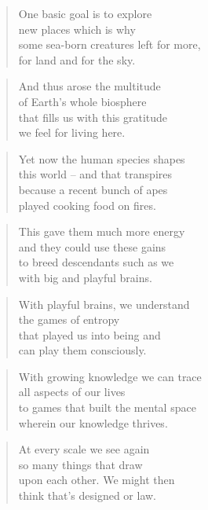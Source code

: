 \documentclass[10pt,a4paper]{article}
\begin{document}
\begin{paracol}{2}
\begin{verse}
One basic goal is to explore\\
new places which is why\\
some sea-born creatures left for more,\\
for land and for the sky.
\end{verse}

\begin{verse}
And thus arose the multitude\\
of Earth’s whole biosphere\\
that fills us with this gratitude\\
we feel for living here.
\end{verse}

\begin{verse}
Yet now the human species shapes\\
this world – and that transpires\\
because a recent bunch of apes\\
played cooking food on fires.
\end{verse}

\begin{verse}
This gave them much more energy\\
and they could use these gains\\
to breed descendants such as we\\
with big and playful brains.
\end{verse}

\begin{verse}
With playful brains, we understand\\
the games of entropy\\
that played us into being and\\
can play them consciously.
\end{verse}

\begin{verse}
With growing knowledge we can trace\\
all aspects of our lives\\
to games that built the mental space\\
wherein our knowledge thrives.
\end{verse}

\begin{verse}
At every scale we see again\\
so many things that draw\\
upon each other. We might then\\
think that’s designed or law.
\end{verse}


\end{paracol}
\end{document}
